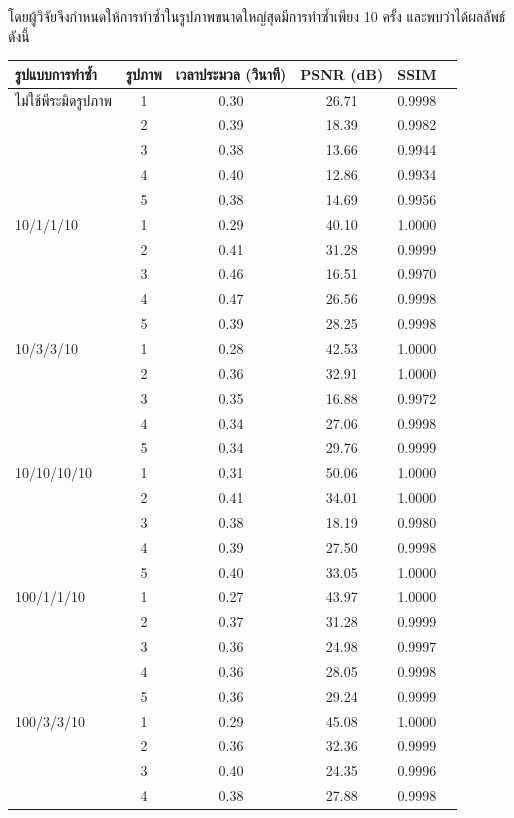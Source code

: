 \documentclass[hidelinks, a4paper,12pt]{article}
\numberwithin{equation}{section}							%
\numberwithin{equation}{section}
\begin{document}
{	 โดยผู้วิจัยจึงกำหนดให้การทำซ้ำในรูปภาพขนาดใหญ่สุดมีการทำซ้ำเพียง 10 ครั้ง และพบว่าได้ผลลัพธ์ดังนี้
		\begin{table}[H]
		\centering
		\small
		\begin{tabular}[ht]{|l|c|c|c|c|c|}
			\hline
			รูปแบบการทำซ้ำ  & รูปภาพ &เวลาประมวล  (วินาที) & PSNR (dB) & SSIM \\
			\hline
			ไม่ใช้พีระมิดรูปภาพ & 1 & 0.30  & 26.71  & 0.9998 \\ 
			& 2 & 0.39  & 18.39  & 0.9982 \\
			& 3 & 0.38 & 13.66  & 0.9944 \\
			& 4 & 0.40  & 12.86 & 0.9934 \\
			& 5 & 0.38 & 14.69 &  0.9956\\
			\hline
			10/1/1/10 & 1 & 0.29 & 40.10 & 1.0000\\
			& 2 & 0.41 & 31.28 & 0.9999 \\
			& 3 & 0.46 & 16.51 & 0.9970 \\
			& 4 & 0.47 & 26.56 & 0.9998\\
			& 5 & 0.39 & 28.25 & 0.9998 \\
			\hline
			10/3/3/10  & 1 & 0.28 & 42.53 & 1.0000\\
			& 2 & 0.36 & 32.91 & 1.0000 \\
			& 3 & 0.35 & 16.88 & 0.9972 \\
			& 4 & 0.34 & 27.06 &  0.9998 \\
			& 5 & 0.34 & 29.76 & 0.9999 \\
			\hline
			10/10/10/10  & 1 & 0.31 & 50.06 & 1.0000 \\
			& 2 & 0.41 & 34.01 & 1.0000\\
			& 3 & 0.38 & 18.19 & 0.9980\\
			& 4 & 0.39 & 27.50 & 0.9998\\
			& 5 & 0.40 & 33.05 &  1.0000\\
			\hline
			100/1/1/10  & 1 & 0.27 & 43.97 & 1.0000 \\
			& 2 & 0.37  & 31.28 & 0.9999\\
			& 3 & 0.36 & 24.98 & 0.9997\\
			& 4 & 0.36  &28.05 & 0.9998\\
			& 5 & 0.36 & 29.24 & 0.9999 \\
			\hline
			100/3/3/10  & 1 & 0.29 & 45.08& 1.0000 \\
			& 2 & 0.36 & 32.36 & 0.9999\\
			& 3 & 0.40 & 24.35 & 0.9996\\
			& 4 & 0.38 & 27.88 & 0.9998\\

\end{tabular}
\end{table}}
\end{document}
